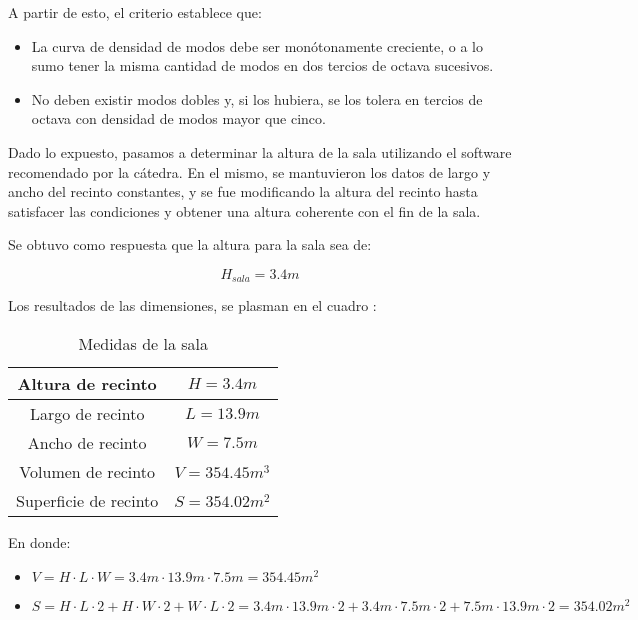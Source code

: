 \par A partir de esto, el criterio establece que:

\begin{itemize}
    \item La curva de densidad de modos debe ser monótonamente creciente, o a lo sumo tener la misma cantidad de modos en dos tercios de octava sucesivos.
    \item No deben existir modos dobles y, si los hubiera, se los tolera en tercios de octava con densidad de modos mayor que cinco.
\end{itemize}

\par Dado lo expuesto, pasamos a determinar la altura de la sala utilizando el software  recomendado por la cátedra. En el mismo, se mantuvieron los datos de largo y ancho del recinto constantes, y se fue modificando la altura del recinto hasta satisfacer las condiciones y obtener una altura coherente con el fin de la sala.

\par Se obtuvo como respuesta que la altura para la sala sea de:

\begin{equation}
    \boxed{ H_{sala} = 3.4m }
\end{equation}

\par Los resultados de las dimensiones, se plasman en el cuadro :

\begin{table}[]
\setlength\arrayrulewidth{1pt}
    \centering
    \begin{tabular}{|c|c|} \hline
        Altura de recinto & $H = 3.4m$ \\ \hline
        Largo de recinto  & $L = 13.9m$\\ \hline
        Ancho de recinto & $W = 7.5m$ \\ \hline
        Volumen de recinto & $V = 354.45 m^3$ \\ \hline
        Superficie de recinto & $S = 354.02m^2$\\ \hline
    \end{tabular}
    \caption{Medidas de la sala}
    \label{tab:medidas_de_sala}
\end{table}

\par En donde: 
\begin{itemize}
    \item $V = H \cdot L \cdot W = 3.4m \cdot 13.9m \cdot 7.5m = 354.45 m^2$ 
    \item $S = H \cdot L \cdot 2 + H \cdot W \cdot 2 + W \cdot L \cdot 2 = 3.4m \cdot 13.9 m  \cdot 2 + 3.4m \cdot 7.5 m  \cdot 2 + 7.5m \cdot 13.9 m  \cdot 2 = 354.02 m^2$
\end{itemize}


